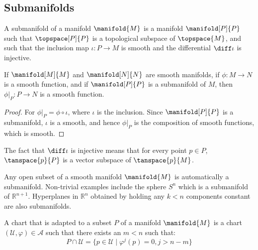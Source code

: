     \subsection{Submanifolds}
        \begin{definition}
            A submanifold of a manifold $\manifold{M}$ is a manifold
            $\manifold[P]{P}$ such that $\topspace[P]{P}$ is a topological
            subspace of $\topspace{M}$, and such that the inclusion map
            $\iota:P\rightarrow{M}$ is smooth and the differential
            $\diff\iota$ is injective.
        \end{definition}
        \begin{theorem}
            If $\manifold[M]{M}$ and $\manifold[N]{N}$ are smooth manifolds,
            if $\phi:M\rightarrow{N}$ is a smooth function, and if
            $\manifold[P]{P}$ is a submanifold of $M$, then
            $\phi|_{P}:P\rightarrow{N}$ is a smooth function.
        \end{theorem}
        \begin{proof}
            For $\phi|_{P}=\phi\circ\iota$, where $\iota$ is the inclusion.
            Since $\manifold[P]{P}$ is a submanifold, $\iota$ is a smooth,
            and hence $\phi|_{P}$ is the composition of smooth functions,
            which is smooth.
        \end{proof}
        The fact that $\diff\iota$ is injective means that for every point
        $p\in{P}$, $\tanspace{p}{P}$ is a vector subspace of
        $\tanspace{p}{M}$.
        \begin{example}
            Any open subset of a smooth manifold $\manifold{M}$ is
            automatically a submanifold. Non-trivial examples include the
            sphere $S^{n}$ which is a submanifold of $\mathbb{R}^{n+1}$.
            Hyperplanes in $\mathbb{R}^{n}$ obtained by holding any $k<n$
            components constant are also submanifolds.
        \end{example}
        \begin{definition}
            A chart that is adapted to a subset $P$ of a manifold
            $\manifold{M}$ is a chart $(\mathcal{U},\varphi)\in\mathcal{A}$
            such that there exists an $m<n$ such that:
            \begin{equation}
                P\cap\mathcal{U}
                    =\{p\in\mathcal{U}\;|\;\varphi^{j}(p)=0,j>n-m\}
            \end{equation}
        \end{definition}
